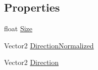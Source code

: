 \subsection*{Properties}
\begin{DoxyCompactItemize}
\item 
float \hyperlink{classgearit_1_1src_1_1robot_1_1_rod_ad81d14d21b0fadeea0babed4dd2dd74a}{Size}
\item 
Vector2 \hyperlink{classgearit_1_1src_1_1robot_1_1_rod_a167a5c3f6a6c7706a260fcef37f9f2d3}{Direction\+Normalized}
\item 
Vector2 \hyperlink{classgearit_1_1src_1_1robot_1_1_rod_aeecb39515796a074caf0159df0a8620a}{Direction}
\end{DoxyCompactItemize}



